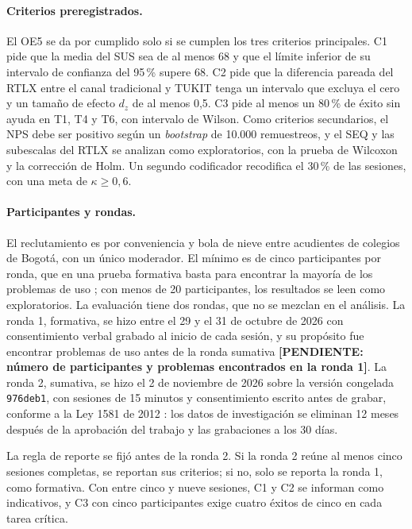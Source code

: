\paragraph{Criterios preregistrados.} El OE5 se da por cumplido solo si se cumplen los tres
criterios principales. C1 pide que la media del SUS sea de al menos 68 y que el límite inferior de
su intervalo de confianza del 95\,\% supere 68. C2 pide que la diferencia pareada del RTLX entre el
canal tradicional y TUKIT tenga un intervalo que excluya el cero y un tamaño de efecto $d_z$ de al
menos 0,5. C3 pide al menos un 80\,\% de éxito sin ayuda en T1, T4 y T6, con intervalo de Wilson.
Como criterios secundarios, el NPS debe ser positivo según un \emph{bootstrap} de 10.000
remuestreos, y el SEQ y las subescalas del RTLX se analizan como exploratorios, con la prueba de
Wilcoxon y la corrección de Holm. Un segundo codificador recodifica el 30\,\% de las sesiones, con
una meta de $\kappa\geq 0{,}6$.

\paragraph{Participantes y rondas.} El reclutamiento es por conveniencia y bola de nieve entre
acudientes de colegios de Bogotá, con un único moderador. El mínimo es de cinco participantes por
ronda, que en una prueba formativa basta para encontrar la mayoría de los problemas de uso
\citep{nielsen_estimating_1994}; con menos de 20 participantes, los resultados se leen como
exploratorios. La evaluación tiene dos rondas, que no se mezclan en el análisis. La ronda 1, formativa,
se hizo entre el 29 y el 31 de octubre de 2026 con consentimiento verbal grabado al inicio de cada
sesión, y su propósito fue encontrar problemas de uso antes de la ronda sumativa
\textbf{[PENDIENTE: número de participantes y problemas encontrados en la ronda 1]}. La ronda 2,
sumativa, se hizo el 2 de noviembre de 2026 sobre la versión congelada \texttt{976deb1}, con
sesiones de 15 minutos y consentimiento escrito antes de grabar, conforme a la Ley 1581 de 2012
\citep{congreso_ley1581_2012}: los datos de investigación se eliminan 12 meses después de la
aprobación del trabajo y las grabaciones a los 30 días.

La regla de reporte se fijó antes de la ronda 2. Si la ronda 2 reúne al menos cinco sesiones
completas, se reportan sus criterios; si no, solo se reporta la ronda 1, como formativa. Con entre
cinco y nueve sesiones, C1 y C2 se informan como indicativos, y C3 con cinco participantes exige
cuatro éxitos de cinco en cada tarea crítica.

